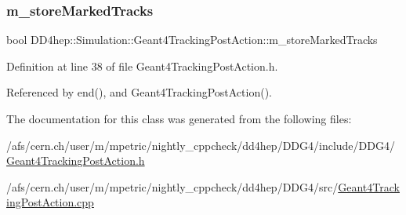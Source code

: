 \subsubsection{\texorpdfstring{m\+\_\+store\+Marked\+Tracks}{m\_storeMarkedTracks}}
{\footnotesize\ttfamily bool D\+D4hep\+::\+Simulation\+::\+Geant4\+Tracking\+Post\+Action\+::m\+\_\+store\+Marked\+Tracks\hspace{0.3cm}{\ttfamily [protected]}}



Definition at line 38 of file Geant4\+Tracking\+Post\+Action.\+h.



Referenced by end(), and Geant4\+Tracking\+Post\+Action().



The documentation for this class was generated from the following files\+:\begin{DoxyCompactItemize}
\item 
/afs/cern.\+ch/user/m/mpetric/nightly\+\_\+cppcheck/dd4hep/\+D\+D\+G4/include/\+D\+D\+G4/\hyperlink{_geant4_tracking_post_action_8h}{Geant4\+Tracking\+Post\+Action.\+h}\item 
/afs/cern.\+ch/user/m/mpetric/nightly\+\_\+cppcheck/dd4hep/\+D\+D\+G4/src/\hyperlink{_geant4_tracking_post_action_8cpp}{Geant4\+Tracking\+Post\+Action.\+cpp}\end{DoxyCompactItemize}
